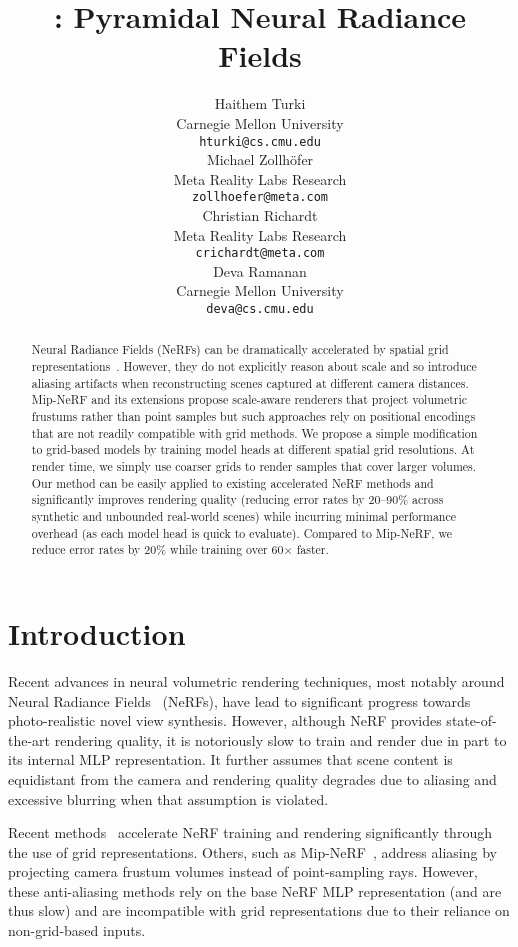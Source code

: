 \documentclass{article}
\title{\method: Pyramidal Neural Radiance Fields}
\author{
  Haithem Turki \\
  Carnegie Mellon University \\
  \texttt{hturki@cs.cmu.edu} \\
  \And
  Michael Zollh\"{o}fer \\
  Meta Reality Labs Research \\
  \texttt{zollhoefer@meta.com} \\
  \AND
  Christian Richardt \\
  Meta Reality Labs Research \\
  \texttt{crichardt@meta.com} \\
  \And
  Deva Ramanan \\
  Carnegie Mellon University \\
  \texttt{deva@cs.cmu.edu} \\
}
\begin{document}
\maketitle


\begin{abstract}
  Neural Radiance Fields (NeRFs) can be dramatically accelerated by spatial grid representations~\cite{yu_and_fridovichkeil2021plenoxels, mueller2022instant, Chen2022ECCV, kplanes_2023}. However, they do not explicitly reason about scale and so introduce aliasing artifacts when reconstructing scenes captured at different camera distances. Mip-NeRF and its extensions propose scale-aware renderers that project volumetric frustums rather than point samples but such approaches rely on positional encodings that are not readily compatible with grid methods. We propose a simple modification to grid-based models by training model heads at different spatial grid resolutions. At render time, we simply use coarser grids to render samples that cover larger volumes. Our method can be easily applied to existing accelerated NeRF methods and significantly improves rendering quality (reducing error rates by 20–90\% across synthetic and unbounded real-world scenes) while incurring minimal performance overhead (as each model head is quick to evaluate). Compared to Mip-NeRF, we reduce error rates by 20\% while training over 60× faster.
\end{abstract}

\section{Introduction}

Recent advances in neural volumetric rendering techniques, most notably around Neural Radiance Fields~\cite{mildenhall2020nerf} (NeRFs), have
lead to significant progress towards photo-realistic novel view synthesis. However, although NeRF provides state-of-the-art rendering quality, it is notoriously slow to train and render due in part to its internal MLP representation. It further assumes that scene content is equidistant from the camera and rendering quality degrades due to aliasing and excessive blurring when that assumption is violated. 

Recent methods~\cite{mueller2022instant, yu_and_fridovichkeil2021plenoxels, kplanes_2023, Chen2022ECCV} accelerate NeRF training and rendering significantly through the use of grid representations. Others, such as Mip-NeRF~\cite{barron2021mipnerf}, address aliasing by projecting camera frustum volumes instead of point-sampling rays. However, these anti-aliasing methods rely on the base NeRF MLP representation (and are thus slow) and are incompatible with grid representations due to their reliance on non-grid-based inputs.
\end{document}

